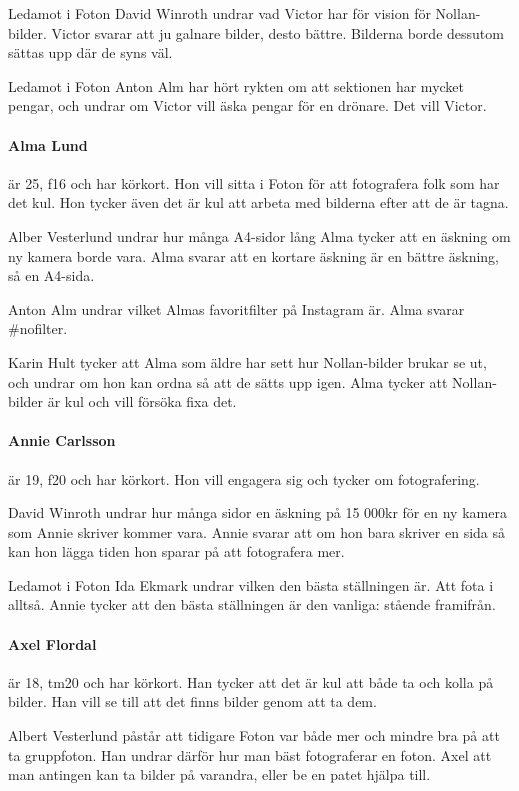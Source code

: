 \documentclass[hidelinks]{sektionsmote}
\begin{document}
Ledamot i Foton David Winroth undrar vad Victor har för vision för Nollan-bilder.
Victor svarar att ju galnare bilder, desto bättre.
Bilderna borde dessutom sättas upp där de syns väl.

Ledamot i Foton Anton Alm har hört rykten om att sektionen har mycket pengar, och undrar om Victor vill äska pengar för en drönare.
Det vill Victor.

\paragraph{Alma Lund} är 25, f16 och har körkort.
Hon vill sitta i Foton för att fotografera folk som har det kul.
Hon tycker även det är kul att arbeta med bilderna efter att de är tagna.

Alber Vesterlund undrar hur många A4-sidor lång Alma tycker att en äskning om ny kamera borde vara.
Alma svarar att en kortare äskning är en bättre äskning, så en A4-sida.

Anton Alm undrar vilket Almas favoritfilter på Instagram är.
Alma svarar \#nofilter.

Karin Hult tycker att Alma som äldre har sett hur Nollan-bilder brukar se ut, och undrar om hon kan ordna så att de sätts upp igen.
Alma tycker att Nollan-bilder är kul och vill försöka fixa det.

\paragraph{Annie Carlsson} är 19, f20 och har körkort.
Hon vill engagera sig och tycker om fotografering.

David Winroth undrar hur många sidor en äskning på 15 000kr för en ny kamera som Annie skriver kommer vara.
Annie svarar att om hon bara skriver en sida så kan hon lägga tiden hon sparar på att fotografera mer.

Ledamot i Foton Ida Ekmark undrar vilken den bästa ställningen är.
Att fota i alltså.
Annie tycker att den bästa ställningen är den vanliga: stående framifrån.

\paragraph{Axel Flordal} är 18, tm20 och har körkort.
Han tycker att det är kul att både ta och kolla på bilder.
Han vill se till att det finns bilder genom att ta dem.

Albert Vesterlund påstår att tidigare Foton var både mer och mindre bra på att ta gruppfoton.
Han undrar därför hur man bäst fotograferar en foton.
Axel att man antingen kan ta bilder på varandra, eller be en patet hjälpa till.
\end{document}
